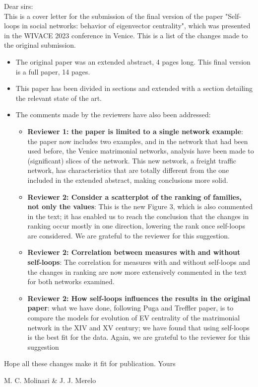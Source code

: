 \documentclass[11pt]{article}
\begin{document}
Dear sirs:\\

This is a cover letter for the submission of the final version of the paper "Self-loops in social networks: behavior of eigenvector centrality", which was presented in the WIVACE 2023 conference in Venice. This is a list of the changes made to the original submission.\begin{itemize}
\item The original paper was an extended abstract, 4 pages long. This final version is a full paper, 14 pages.
\item This paper has been divided in sections and extended with a section detailing the relevant state of the art.
\item The comments made by the reviewers have also been addressed:\begin{itemize}
  \item \textbf{Reviewer 1: the paper is limited to a single network example}: the paper now includes two examples, and in the network that had been used before, the Venice matrimonial networks, analysis have been made to (significant) slices of the network. This new network, a freight traffic network, has characteristics that are totally different from the one included in the extended abstract, making conclusions more solid.
  \item \textbf{Reviewer 2: Consider a scatterplot of the ranking of families, not only the values}: This is the new Figure 3, which is also commented in the text; it has enabled us to reach the conclusion that the changes in ranking occur mostly in one direction, lowering the rank once self-loops are considered. We are grateful to the reviewer for this suggestion.
  \item \textbf{Reviewer 2: Correlation between measures with and without self-loops}: The correlation for measures with and without self-loops and the changes in ranking are now more extensively commented in the text for both networks examined.
  \item \textbf{Reviewer 2: How self-loops influences the results in the original paper}:  what we have done, following Puga and Treffler paper, is to compare the models for evolution of EV centrality of the matrimonial network in the XIV and XV century; we have found that using self-loops is the best fit for the data. Again, we are grateful to the reviewer for this suggestion
  \end{itemize}
  \end{itemize}
  
Hope all these changes make it fit for publication. Yours\\


\centerline{M. C. Molinari \& J. J. Merelo}
\end{document}
